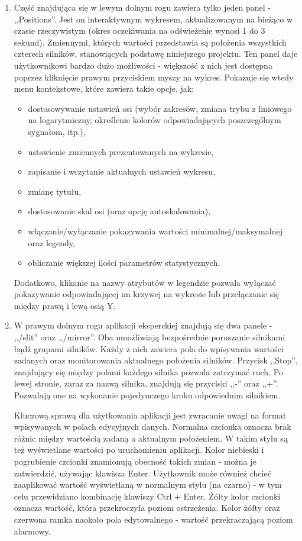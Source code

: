 \begin{enumerate}
	\item Część znajdująca się w lewym dolnym rogu zawiera tylko jeden panel - ,,Positions''. Jest on interaktywnym wykresem, aktualizowanym na bieżąco w czasie rzeczywistym (okres oczekiwania na odświeżenie wynosi 1 do 3 sekund). Zmiennymi, których wartości przedstawia są położenia wszystkich czterech silników, stanowiących podstawę niniejszego projektu. Ten panel daje użytkownikowi bardzo dużo możliwości - większość z nich jest dostępna poprzez kliknięcie prawym przyciskiem myszy na wykres. Pokazuje się wtedy menu kontekstowe, które zawiera takie opcje, jak:
	\begin{itemize}
		\item dostosowywanie ustawień osi (wybór zakresów, zmiana trybu z liniowego na logarytmiczny, określenie kolorów odpowiadających poszczególnym sygnałom, itp.),
		\item ustawienie zmiennych prezentowanych na wykresie,
		\item zapisanie i wczytanie aktualnych ustawień wykresu,
		\item zmianę tytułu,
		\item dostosowanie skal osi (oraz opcję autoskalowania),
		\item włączanie/wyłączanie pokazywania wartości minimalnej/maksymalnej oraz legendy,
		\item obliczanie większej ilości parametrów statystycznych.
	\end{itemize}
	Dodatkowo, klikanie na nazwy atrybutów w legendzie pozwala wyłączać pokazywanie odpowiadającej im krzywej na wykresie lub przełączanie się między prawą i lewą osią Y.
	
	\item W prawym dolnym rogu aplikacji eksperckiej znajdują się dwa panele - ,,/slit'' oraz ,,/mirror''. Oba umożliwiają bezpośrednie poruszanie silnikami bądź grupami silników. Każdy z nich zawiera pola do wpisywania wartości zadanych oraz monitorowania aktualnego położenia silników. Przycisk ,,Stop'', znajdujący się między polami każdego silnika pozwala zatrzymać ruch. Po lewej stronie, zaraz za nazwą silnika, znajdują się przyciski ,,-'' oraz ,,+''. Pozwalają one na wykonanie pojedynczego kroku odpowiednim silnikiem.
	
	Kluczową sprawą dla użytkowania aplikacji jest zwracanie uwagi na format wpisywanych w polach edycyjnych danych. Normalna czcionka oznacza brak różnic między wartością zadaną a aktualnym położeniem. W takim stylu są też wyświetlane wartości po uruchomieniu aplikacji. Kolor niebieski i pogrubienie czcionki znamionują obecność takich zmian - można je zatwierdzić, używając klawisza Enter. Użytkownik może również chcieć zaaplikować wartość wyświetlaną w normalnym stylu (na czarno) - w tym celu przewidziano kombinację klawiszy Ctrl + Enter. Żółty kolor czcionki oznacza wartość, która przekroczyła poziom ostrzeżenia. Kolor żółty oraz czerwona ramka naokoło pola edytowalnego - wartość przekraczającą poziom alarmowy.
	

\end{enumerate}

